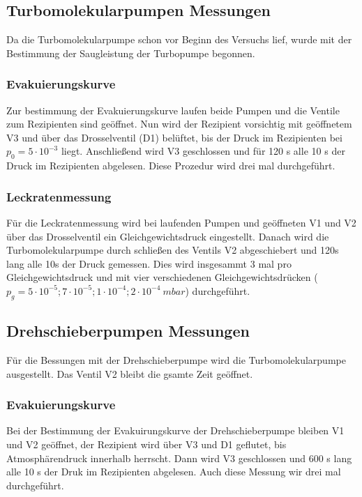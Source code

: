 \subsection{Turbomolekularpumpen Messungen}
\label{sec:Turbomolekularpumpen Messungen}
Da die Turbomolekularpumpe schon vor Beginn des Versuchs lief, wurde mit der Bestimmung der Saugleistung der Turbopumpe begonnen.

\subsubsection{Evakuierungskurve}
\label{sec:Evakuierungskurve1}
Zur bestimmung der Evakuierungskurve laufen beide Pumpen und die Ventile zum Rezipienten sind geöffnet.
Nun wird der Rezipient vorsichtig mit geöffnetem V3 und über das Drosselventil (D1) belüftet, bis der Druck im Rezipienten bei $p_0 = 5 \cdot 10^{-3}$ liegt.
Anschließend wird V3 geschlossen und für 120 s alle 10 s der Druck im Rezipienten abgelesen.
Diese Prozedur wird drei mal durchgeführt.

\subsubsection{Leckratenmessung}
\label{sec:Leckratenmessung1}
Für die Leckratenmessung wird bei laufenden Pumpen und geöffneten V1 und V2 über das Drosselventil ein Gleichgewichtsdruck eingestellt.
Danach wird die Turbomolekularpumpe durch schließen des Ventils V2 abgeschiebert und 120s lang alle 10s der Druck gemessen.
Dies wird insgesammt 3 mal pro Gleichgewichtsdruck und mit vier verschiedenen Gleichgewichtsdrücken ($p_g = 5 \cdot 10^{-5}; 7 \cdot 10^{-5}; 1 \cdot 10^{-4}; 2 \cdot 10^{-4}\: mbar$) durchgeführt.

\subsection{Drehschieberpumpen Messungen}
\label{sec:Drehschieberpumpen Messungen}
Für die Bessungen mit der Drehschieberpumpe wird die Turbomolekularpumpe ausgestellt. Das Ventil V2 bleibt die gsamte Zeit geöffnet.

\subsubsection{Evakuierungskurve}
\label{sec:Evakuierungskurve2}
Bei der Bestimmung der Evakuirungskurve der Drehschieberpumpe bleiben V1 und V2 geöffnet, der Rezipient wird über V3 und D1 geflutet, 
bis Atmosphärendruck innerhalb herrscht. Dann wird V3 geschlossen und 600 s lang alle 10 s der Druk im Rezipienten abgelesen.
Auch diese Messung wir drei mal durchgeführt.

